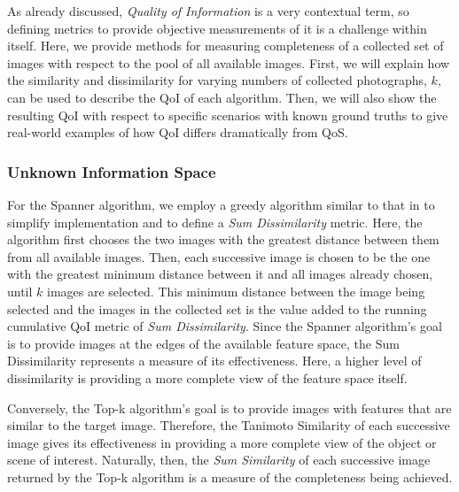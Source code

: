 As already discussed, \emph{Quality of Information} is a very contextual term, so defining metrics to provide objective measurements of it is a challenge within itself.  Here, we provide methods for measuring completeness of a collected set of images with respect to the pool of all available images.  First, we will explain how the similarity and dissimilarity for varying numbers of collected photographs, $k$, can be used to describe the QoI of each algorithm.  Then, we will also show the resulting QoI with respect to specific scenarios with known ground truths to give real-world examples of how QoI differs dramatically from QoS.

\subsubsection{Unknown Information Space}
For the Spanner algorithm, we employ a greedy algorithm similar to that in \cite{mediascope} to simplify implementation and to define a \emph{Sum Dissimilarity} metric.  Here, the algorithm first chooses the two images with the greatest distance between them from all available images.  Then, each successive image is chosen to be the one with the greatest minimum distance between it and all images already chosen, until $k$ images are selected.  This minimum distance between the image being selected and the images in the collected set is the value added to the running cumulative QoI metric of \emph{Sum Dissimilarity}.  Since the Spanner algorithm's goal is to provide images at the edges of the available feature space, the Sum Dissimilarity represents a measure of its effectiveness.  Here, a higher level of dissimilarity is providing a more complete view of the feature space itself.


Conversely, the Top-k algorithm's goal is to provide images with features that are similar to the target image.  Therefore, the Tanimoto Similarity of each successive image gives its effectiveness in providing a more complete view of the object or scene of interest.  Naturally, then, the \emph{Sum Similarity} of each successive image returned by the Top-k algorithm is a measure of the completeness being achieved.

